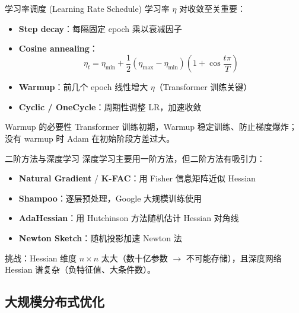 \documentclass[11pt, aspectratio=169, svgnames, table, fontset=fandol]{ctexbeamer}
\begin{document}
\begin{frame}{学习率调度 (Learning Rate Schedule)}
  学习率 $\eta$ 对收敛至关重要：

  \begin{itemize}
    \item \textbf{Step decay}：每隔固定 epoch 乘以衰减因子
    \item \textbf{Cosine annealing}：
      \begin{equation*}
        \eta_t = \eta_{\min} + \frac12(\eta_{\max} - \eta_{\min})\left(1 + \cos\frac{t\pi}{T}\right)
      \end{equation*}
    \item \textbf{Warmup}：前几个 epoch 线性增大 $\eta$（Transformer 训练关键）
    \item \textbf{Cyclic / OneCycle}：周期性调整 LR，加速收敛
  \end{itemize}

  \vspace{4pt}
  \begin{block}{Warmup 的必要性}
    Transformer 训练初期，Warmup 稳定训练、防止梯度爆炸；没有 warmup 时 Adam 在初始阶段方差过大。
  \end{block}
\end{frame}

\begin{frame}{二阶方法与深度学习}
  深度学习主要用一阶方法，但二阶方法有吸引力：
  \begin{itemize}
    \item \textbf{Natural Gradient} / \textbf{K-FAC}：用 Fisher 信息矩阵近似 Hessian
    \item \textbf{Shampoo}：逐层预处理，Google 大规模训练使用
    \item \textbf{AdaHessian}：用 Hutchinson 方法随机估计 Hessian 对角线
    \item \textbf{Newton Sketch}：随机投影加速 Newton 法
  \end{itemize}

  \vspace{6pt}
  挑战：Hessian 维度 $n \times n$ 太大（数十亿参数 $\to$ 不可能存储），且深度网络 Hessian 谱复杂（负特征值、大条件数）。
\end{frame}

\subsection{大规模分布式优化}
\end{document}
